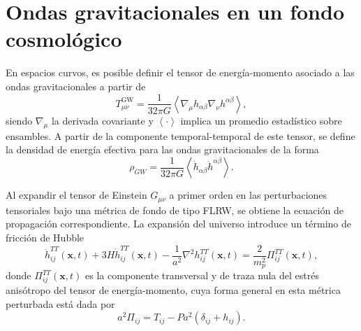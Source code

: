 \section{Ondas gravitacionales en un fondo cosmológico}

En espacios curvos, es posible definir el tensor de energía-momento asociado a las ondas gravitacionales \cite{Caprini_2020} a partir de
\begin{equation}
    T^{\text{GW}}_{\mu\nu} = \frac{1}{32 \pi G} \left\langle \nabla_\mu h_{\alpha \beta} \nabla_\nu h^{\alpha \beta}  \right\rangle,
\end{equation}
siendo $\nabla_\mu$ la derivada covariante y $\left\langle \cdot \right\rangle$ implica un promedio estadístico sobre ensambles. A partir de la componente temporal-temporal de este tensor, se define la densidad de energía efectiva para las ondas gravitacionales de la forma
\begin{equation}\label{eqn:rhoGW(2.10)}
    \rho_{GW} = \frac{1}{32 \pi G} \left\langle \dot{h}_{\alpha \beta} \dot{h}^{\alpha \beta} \right\rangle.
\end{equation}

Al expandir el tensor de Einstein $G_{\mu\nu}$ a primer orden en las perturbaciones tensoriales bajo una métrica de fondo de tipo FLRW, se obtiene la ecuación de propagación correspondiente. La expansión del universo introduce un término de fricción de Hubble \cite{Caprini_2020}
\begin{equation}
    \ddot{h}^{TT}_{ij} \left( \textbf{x}, t \right) + 3 H \dot{h}^{TT}_{ij} \left( \textbf{x}, t \right) - \frac{1}{a^2} \nabla^2 h^{TT}_{ij} \left( \textbf{x}, t \right) = \frac{2}{m_p^2} \Pi_{ij}^{TT} \left( \textbf{x}, t \right),
\end{equation}
donde $\Pi_{ij}^{TT} \left( \textbf{x}, t \right)$ es la componente transversal y de traza nula del estrés anisótropo del tensor de energía-momento, cuya forma general en esta métrica perturbada está dada por \cite{Maggiore_2018}
\begin{equation}
    a^2 \Pi_{ij} = T_{ij} - P a^2 \left( \delta_{ij} + h_{ij} \right).
\end{equation}


